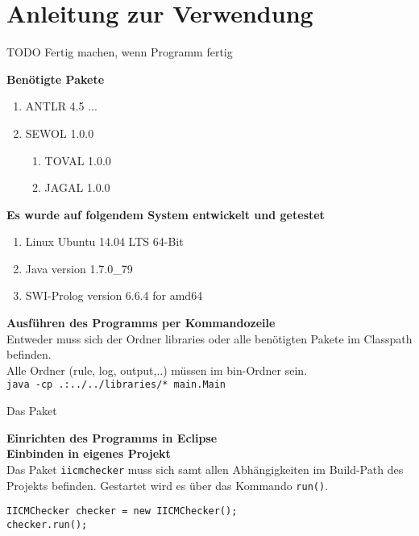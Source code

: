 
\chapter{Anleitung zur Verwendung} %

\label{UserManual} %


\color{red} TODO Fertig machen, wenn Programm fertig
\color{black}

\textbf{Benötigte Pakete}
\begin{enumerate}
\item ANTLR 4.5 ...
\item SEWOL 1.0.0
\begin{enumerate}
\item TOVAL 1.0.0
\item JAGAL 1.0.0
\end{enumerate}
\end{enumerate}

\textbf{Es wurde auf folgendem System entwickelt und getestet}
\begin{enumerate}
\item Linux Ubuntu 14.04 LTS 64-Bit
\item Java version 1.7.0\_79
\item SWI-Prolog version 6.6.4 for amd64
\end{enumerate}

\textbf{Ausführen des Programms per Kommandozeile}\\
Entweder muss sich der Ordner libraries oder alle benötigten Pakete im Classpath befinden.\\
Alle Ordner (rule, log, output,..) müssen im bin-Ordner sein.\\

\texttt{java -cp .:../../libraries/* main.Main}



Das Paket \texttt{}

\textbf{Einrichten des Programms in Eclipse}\\


\textbf{Einbinden in eigenes Projekt}\\
Das Paket \texttt{iicmchecker} muss sich samt allen Abhängigkeiten im Build-Path des Projekts befinden. Gestartet wird es über das Kommando \texttt{run()}.\\
\begin{verbatim}
IICMChecker checker = new IICMChecker();
checker.run();
\end{verbatim}

